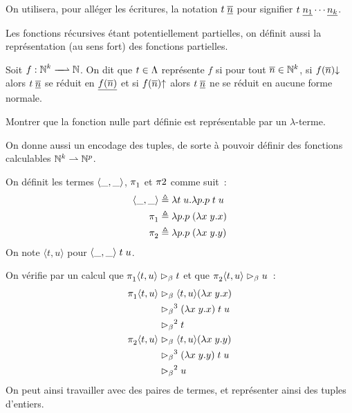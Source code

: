 \begin{notation}
  On utilisera, pour alléger les écritures, la notation
  $t\;\underline{\overline{n}}$ pour signifier $t\;\underline{n_1}\cdots\underline{n_k}$.
\end{notation}

Les fonctions récursives étant potentiellement partielles, on définit aussi la
représentation (au sens fort) des fonctions partielles.

\begin{definition}
  Soit $\makeFunNamePartial{f}{\bN^k}{\bN}$. On dit que $t \in \Lambda$
  représente $f$ si pour tout $\overline{n} \in \mathbb N^k$, si
  $f(\overline{n}) \mathbin{\downarrow}$ alors $t\;\underline{\overline{n}}$ se réduit en
  $\underline{f(\overline{n})}$ et si $f(\overline{n})\mathbin{\uparrow}$ alors
  $t\;\underline{\overline{n}}$ ne se réduit en aucune forme normale.
\end{definition}

\begin{exercise}
  Montrer que la fonction nulle part définie est représentable par un
  $\lambda$-terme.
\end{exercise}

On donne aussi un encodage des tuples, de sorte à pouvoir définir des fonctions
calculables $\mathbb N^k\rightharpoonup \mathbb N^p$.

\begin{definition}
  On définit les termes $\langle\mathord{\_},\mathord{\_}\rangle$, $\mathop{\pi_{1}^{}}$ et $\pi{2}{}$
  comme suit~:
  \begin{align*}
    \langle\mathord{\_},\mathord{\_}\rangle &\triangleq \lambda t\;u.\lambda p. p\;t\;u\\
    \mathop{\pi_{1}^{}} &\triangleq \lambda p.p\;(\lambda x\;y.x)\\
    \mathop{\pi_{2}^{}} &\triangleq \lambda p.p\;(\lambda x\;y.y)
  \end{align*}
  On note $\langle t,u\rangle$ pour $\langle\mathord{\_},\mathord{\_}\rangle\;t\;u$.
\end{definition}

On vérifie par un calcul que $\mathop{\pi_{1}^{}}\langle t,u\rangle \mathrel{\rhd_{\beta}} t$ et que
$\mathop{\pi_{2}^{}}\langle t,u\rangle \mathrel{\rhd_{\beta}} u$~:
\begin{align*}
  \mathop{\pi_{1}^{}}\langle t,u\rangle &\mathrel{\rhd_{\beta}} \langle t,u\rangle (\lambda x\;y.x)\\
  &\mathrel{\rhd_{\beta}}^3 (\lambda x\;y.x)\;t\;u\\
  &\mathrel{\rhd_{\beta}}^2 t \\
  \mathop{\pi_{2}^{}}\langle t,u\rangle &\mathrel{\rhd_{\beta}} \langle t,u\rangle (\lambda x\;y.y)\\
  &\mathrel{\rhd_{\beta}}^3 (\lambda x\;y.y)\;t\;u\\
  &\mathrel{\rhd_{\beta}}^2 u
\end{align*}
On peut ainsi travailler avec des paires de termes, et représenter ainsi des
tuples d'entiers.

